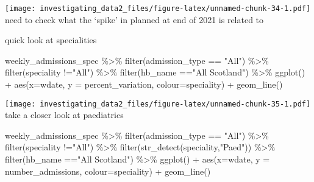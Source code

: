 \documentclass[
]{article}
\newenvironment{Shaded}{\begin{snugshade}}{\end{snugshade}}
\newcommand{\AttributeTok}[1]{\textcolor[rgb]{0.77,0.63,0.00}{#1}}
\newcommand{\FunctionTok}[1]{\textcolor[rgb]{0.00,0.00,0.00}{#1}}
\newcommand{\NormalTok}[1]{#1}
\newcommand{\SpecialCharTok}[1]{\textcolor[rgb]{0.00,0.00,0.00}{#1}}
\newcommand{\StringTok}[1]{\textcolor[rgb]{0.31,0.60,0.02}{#1}}
\begin{document}
\texttt{[image: investigating\_data2\_files/figure-latex/unnamed-chunk-34-1.pdf]}
need to check what the `spike' in planned at end of 2021 is related to

quick look at specialities

\begin{Shaded}
\begin{Highlighting}[]
\NormalTok{weekly\_admissions\_spec }\SpecialCharTok{\%\textgreater{}\%} 
  \FunctionTok{filter}\NormalTok{(admission\_type }\SpecialCharTok{==} \StringTok{"All"}\NormalTok{) }\SpecialCharTok{\%\textgreater{}\%} 
  \FunctionTok{filter}\NormalTok{(speciality }\SpecialCharTok{!=}\StringTok{"All"}\NormalTok{) }\SpecialCharTok{\%\textgreater{}\%} 
  \FunctionTok{filter}\NormalTok{(hb\_name }\SpecialCharTok{==}\StringTok{"All Scotland"}\NormalTok{) }\SpecialCharTok{\%\textgreater{}\%} 
\FunctionTok{ggplot}\NormalTok{() }\SpecialCharTok{+}
\FunctionTok{aes}\NormalTok{(}\AttributeTok{x=}\NormalTok{wdate, }\AttributeTok{y =}\NormalTok{ percent\_variation, }\AttributeTok{colour=}\NormalTok{speciality) }\SpecialCharTok{+}
\FunctionTok{geom\_line}\NormalTok{()}
\end{Highlighting}
\end{Shaded}

\texttt{[image: investigating\_data2\_files/figure-latex/unnamed-chunk-35-1.pdf]}
take a closer look at paediatrics

\begin{Shaded}
\begin{Highlighting}[]
\NormalTok{weekly\_admissions\_spec }\SpecialCharTok{\%\textgreater{}\%} 
  \FunctionTok{filter}\NormalTok{(admission\_type }\SpecialCharTok{==} \StringTok{"All"}\NormalTok{) }\SpecialCharTok{\%\textgreater{}\%} 
  \FunctionTok{filter}\NormalTok{(speciality }\SpecialCharTok{!=}\StringTok{"All"}\NormalTok{) }\SpecialCharTok{\%\textgreater{}\%} 
  \FunctionTok{filter}\NormalTok{(}\FunctionTok{str\_detect}\NormalTok{(speciality,}\StringTok{"Paed"}\NormalTok{)) }\SpecialCharTok{\%\textgreater{}\%} 
  \FunctionTok{filter}\NormalTok{(hb\_name }\SpecialCharTok{==}\StringTok{"All Scotland"}\NormalTok{) }\SpecialCharTok{\%\textgreater{}\%} 
\FunctionTok{ggplot}\NormalTok{() }\SpecialCharTok{+}
\FunctionTok{aes}\NormalTok{(}\AttributeTok{x=}\NormalTok{wdate, }\AttributeTok{y =}\NormalTok{ number\_admissions, }\AttributeTok{colour=}\NormalTok{speciality) }\SpecialCharTok{+}
\FunctionTok{geom\_line}\NormalTok{()}
\end{Highlighting}
\end{Shaded}
\end{document}
